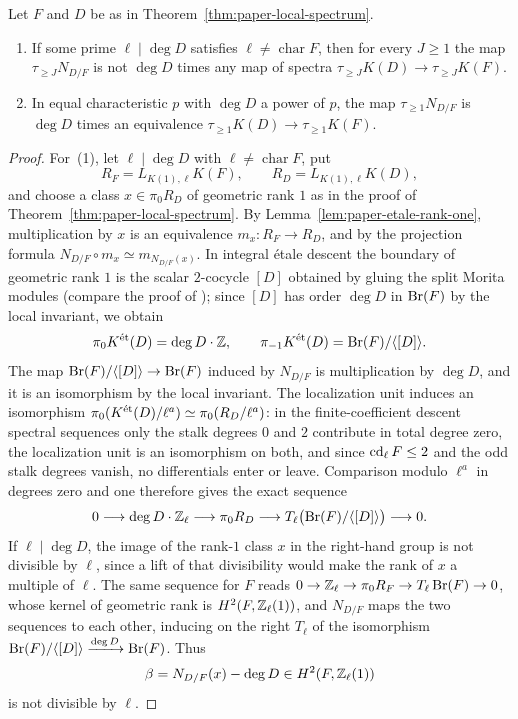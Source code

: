 \begin{proposition}\label{prop:paper-local-no-division}
Let $F$ and $D$ be as in Theorem~\ref{thm:paper-local-spectrum}.
\begin{enumerate}
\item If some prime $\ell\mid\deg D$ satisfies $\ell\ne\operatorname{char}F$, then for every $J\ge1$ the map $\tau_{\ge J}N_{D/F}$ is not $\deg D$ times any map of spectra $\tau_{\ge J}K(D)\to\tau_{\ge J}K(F)$.
\item In equal characteristic $p$ with $\deg D$ a power of $p$, the map $\tau_{\ge1}N_{D/F}$ is $\deg D$ times an equivalence $\tau_{\ge1}K(D)\to\tau_{\ge1}K(F)$.
\end{enumerate}
\end{proposition}
\begin{proof}
For~(1), let $\ell\mid\deg D$ with $\ell\ne\operatorname{char}F$, put
\[
 R_F=L_{K(1),\ell}K(F),\qquad R_D=L_{K(1),\ell}K(D),
\]
and choose a class $x\in\pi_0R_D$ of geometric rank $1$ as in the proof of Theorem~\ref{thm:paper-local-spectrum}.
By Lemma~\ref{lem:paper-etale-rank-one}, multiplication by $x$ is an equivalence $m_x\colon R_F\to R_D$, and by the projection formula $N_{D/F}\circ m_x\simeq m_{N_{D/F}(x)}$.
In integral \'etale descent the boundary of geometric rank $1$ is the scalar $2$-cocycle $[D]$ obtained by gluing the split Morita modules (compare the proof of \cite[Proposition 6.9.1]{KahnLevine2010}); since $[D]$ has order $\deg D$ in $\operatorname{Br}(F)$ by the local invariant, we obtain
\[
 \pi_0K^{\mathrm{\acute et}}(D)=\deg D\cdot\mathbb Z,\qquad \pi_{-1}K^{\mathrm{\acute et}}(D)=\operatorname{Br}(F)/\langle[D]\rangle.
\]
The map $\operatorname{Br}(F)/\langle[D]\rangle\to\operatorname{Br}(F)$ induced by $N_{D/F}$ is multiplication by $\deg D$, and it is an isomorphism by the local invariant.
The localization unit induces an isomorphism $\pi_0(K^{\mathrm{\acute et}}(D)/\ell^a)\simeq\pi_0(R_D/\ell^a)$: in the finite-coefficient descent spectral sequences only the stalk degrees $0$ and $2$ contribute in total degree zero, the localization unit is an isomorphism on both, and since $\operatorname{cd}_\ell F\le2$ and the odd stalk degrees vanish, no differentials enter or leave.
Comparison modulo $\ell^a$ in degrees zero and one therefore gives the exact sequence
\[
 0\longrightarrow \deg D\cdot\mathbb Z_\ell\longrightarrow\pi_0R_D
 \longrightarrow T_\ell\bigl(\operatorname{Br}(F)/\langle[D]\rangle\bigr)\longrightarrow0.
\]
If $\ell\mid\deg D$, the image of the rank-$1$ class $x$ in the right-hand group is not divisible by $\ell$, since a lift of that divisibility would make the rank of $x$ a multiple of $\ell$.
The same sequence for $F$ reads $0\to\mathbb Z_\ell\to\pi_0R_F\to T_\ell\operatorname{Br}(F)\to0$, whose kernel of geometric rank is $H^2(F,\mathbb Z_\ell(1))$, and $N_{D/F}$ maps the two sequences to each other, inducing on the right $T_\ell$ of the isomorphism $\operatorname{Br}(F)/\langle[D]\rangle\xrightarrow{\deg D}\operatorname{Br}(F)$.
Thus
\[
 \beta=N_{D/F}(x)-\deg D\in H^2(F,\mathbb Z_\ell(1))
\]
is not divisible by $\ell$.


\end{proof}

